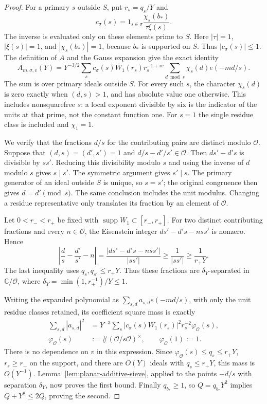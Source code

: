 \begin{proof}
For a primary $s$ outside $S$, put $r_s=q_s/Y$ and
\[
 c_\sigma(s)=1_{s\in\sigma}\frac{\chi_s(b_*)}{\tau\xi(s)}.
\]
The inverse is evaluated only on these elements prime to $S$.  Here $|\tau|=1$,
$|\xi(s)|=1$, and $|\chi_s(b_*)|=1$, because $b_*$ is supported on $S$.
Thus $|c_\sigma(s)|\le1$.  The definition of $A$ and the Gauss expansion
give the exact identity
\[
 A_{m,\sigma,v}(Y)
 =Y^{-3/2}\sum_s c_\sigma(s)W_1(r_s)r_s^{-1+iv}
       \sum_{d\bmod s}\chi_s(d)e(-md/s).
\]
The sum is over primary ideals outside $S$.  For every such $s$, the
character $\chi_s(d)$ is zero exactly when $(d,s)>1$, and has absolute value
one otherwise.  This includes nonsquarefree $s$: a local exponent divisible
by six is the indicator of the units at that prime, not the constant
function one.  For $s=1$ the single residue class is included and
$\chi_1=1$.

We verify that the fractions $d/s$ for the contributing pairs are distinct
modulo $\mathcal O$.  Suppose that $(d,s)=(d',s')=1$ and
$d/s-d'/s'\in\mathcal O$.  Then $ds'-d's$ is divisible by $ss'$.
Reducing this divisibility modulo $s$ and using the inverse of $d$ modulo
$s$ gives $s\mid s'$.  The symmetric argument gives $s'\mid s$.
The primary generator of an ideal outside $S$ is unique, so $s=s'$;
the original congruence then gives $d=d'\pmod s$.  The same conclusion
includes the unit modulus.  Changing a residue representative only
translates its fraction by an element of $\mathcal O$.

Let $0<r_-<r_+$ be fixed with $\operatorname{supp}W_1\subset[r_-,r_+]$.
For two distinct contributing fractions and every $n\in\mathcal O$,
the Eisenstein integer $ds'-d's-nss'$ is nonzero.  Hence
\[
 \left|\frac d s-\frac{d'}{s'}-n\right|
 =\frac{|ds'-d's-nss'|}{|ss'|}
 \ge\frac1{|ss'|}\ge\frac1{r_+Y}.
\]
The last inequality uses $q_s,q_{s'}\le r_+Y$.  Thus these fractions are
$\delta_Y$-separated in $\mathbb C/\mathcal O$, where
$\delta_Y=\min(1,r_+^{-1})/Y\le1$.

Writing the expanded polynomial as
$\sum_{s,d}a_{s,d}e(-md/s)$, with only the unit residue classes retained,
its coefficient square mass is exactly
\[
 \begin{split}
 \sum_{s,d}|a_{s,d}|^2
 &=Y^{-3}\sum_s |c_\sigma(s)W_1(r_s)|^2r_s^{-2}
       \varphi_{\mathcal O}(s),\\
 \varphi_{\mathcal O}(s)
 &:=\#(\mathcal O/s\mathcal O)^\times,\qquad
 \varphi_{\mathcal O}(1):=1.
 \end{split}
\]
There is no dependence on $v$ in this expression.  Since
$\varphi_{\mathcal O}(s)\le q_s\le r_+Y$, $r_s\ge r_-$ on the support,
and there are $O(Y)$ ideals with $q_s\le r_+Y$, this mass is $O(Y^{-1})$.
Lemma~\ref{lem:planar-additive-sieve}, applied to the points $-d/s$ with
separation $\delta_Y$, now proves the first bound.  Finally $q_{b_*}\ge1$,
so $Q=q_{b_*}Y^2$ implies $Q+Y^2\le2Q$, proving the second.
\end{proof}

